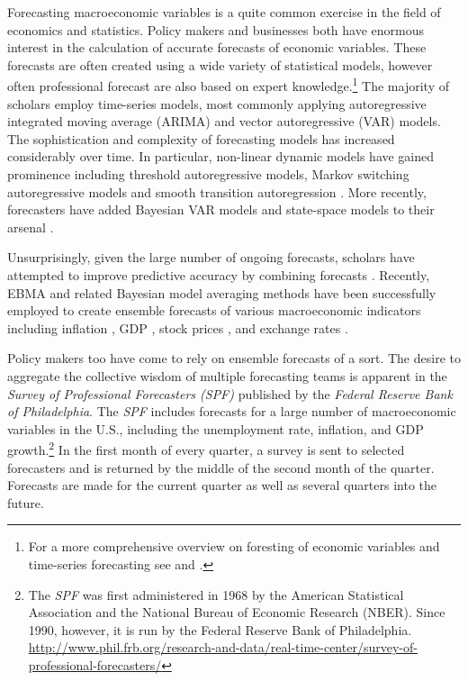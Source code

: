 \documentclass[12pt,fullpage,endnotes]{article}
\begin{document}
Forecasting macroeconomic variables is a quite common exercise in the
field of economics and statistics. Policy makers and businesses both
have enormous interest in the calculation of accurate forecasts of
economic variables. These forecasts are often created using a wide
variety of statistical models, however often professional forecast are
also based on expert knowledge.\footnote{For a more comprehensive
  overview on foresting of economic variables and time-series
  forecasting see \citet{Elliott:Timmermann:2008} and
  \citet{Goijer:Hyndman:2006}.}  The majority of scholars employ
time-series models, most commonly applying autoregressive integrated
moving average (ARIMA) and vector autoregressive (VAR) models. The
sophistication and complexity of forecasting models has increased
considerably over time. In particular, non-linear dynamic models have
gained prominence including threshold autoregressive models, Markov
switching autoregressive models and smooth transition autoregression
\citep{Elliott:Timmermann:2008,Montgomery:etal:1998}. More recently,
forecasters have added Bayesian VAR models and state-space models to
their arsenal \citep{Goijer:Hyndman:2006,Elliott:Timmermann:2008}.

Unsurprisingly, given the large number of ongoing forecasts, scholars
have attempted to improve predictive accuracy by combining forecasts
\citep{Bates:1969, Palm:Zellner:1992, Elliott:Timmermann:2008}.
Recently, EBMA and related Bayesian model averaging methods have been
successfully employed to create ensemble forecasts of various
macroeconomic indicators including inflation
\citep{Koop:2010,Wright:2009}, GDP \citep{Billio:2010}, stock prices
\citep{Billio:2011}, and exchange rates \citep{Wright:2008}.

Policy makers too have come to rely on ensemble forecasts of a sort.
The desire to aggregate the collective wisdom of multiple forecasting
teams is apparent in the \textit{Survey of Professional Forecasters
  (SPF)} published by the \textit{Federal Reserve Bank of
  Philadelphia}.  The \textit{SPF} includes forecasts for a large
number of macroeconomic variables in the U.S., including the
unemployment rate, inflation, and GDP growth.\footnote{The
  \textit{SPF} was first administered in 1968 by the American
  Statistical Association and the National Bureau of Economic Research
  (NBER).  Since 1990, however, it is run by the Federal Reserve Bank
  of Philadelphia.
  \url{http://www.phil.frb.org/research-and-data/real-time-center/survey-of-professional-forecasters/}}
In the first month of every quarter, a survey is sent to selected
forecasters and is returned by the middle of the second month of the
quarter. Forecasts are made for the current quarter as well as several
quarters into the future.
\end{document}
